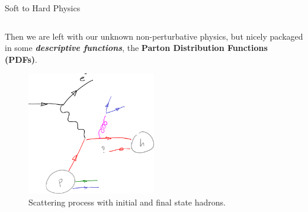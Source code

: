 \documentclass[9pt]{beamer}
\begin{document}
\begin{frame}{Soft to Hard Physics}
\begin{columns}
\begin{column}{0.5\textwidth}
            Then we are left with our unknown non-perturbative physics, but
            nicely packaged in some \textbf{\textit{descriptive functions}},
            the \textbf{\alert{Parton Distribution Functions} (PDFs)}.
            \vspace*{10pt}

            \begin{figure}
                \centering
                \includegraphics[width=0.5\textwidth]{pdf-ff}
                \vspace*{10pt}
                \caption{
                    Scattering process with initial and final state hadrons.
                }
            \end{figure}
        \end{column}
    \end{columns}
\end{frame}
\end{document}
